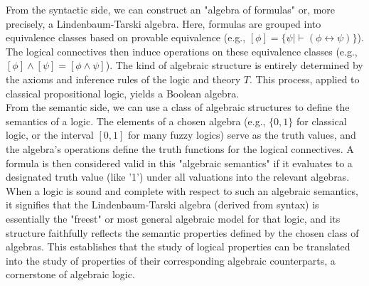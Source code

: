From the syntactic side, we can construct an "algebra of formulas" or, more precisely, a Lindenbaum-Tarski algebra. Here, formulas are grouped into equivalence classes based on provable equivalence (e.g., $[\phi] = \{\psi \mid \vdash (\phi \leftrightarrow \psi)\}$). The logical connectives then induce operations on these equivalence classes (e.g., $[\phi] \wedge [\psi] = [\phi \wedge \psi]$). The kind of algebraic structure is entirely determined by the axioms and inference rules of the logic and theory $T$. This process, applied to classical propositional logic, yields a Boolean algebra.\\

From the semantic side, we can use a class of algebraic structures to define the semantics of a logic. The elements of a chosen algebra (e.g., $\{0,1\}$ for classical logic, or the interval $[0,1]$ for many fuzzy logics) serve as the truth values, and the algebra's operations define the truth functions for the logical connectives. A formula is then considered valid in this "algebraic semantics" if it evaluates to a designated truth value (like '1') under all valuations into the relevant algebras. When a logic is sound and complete with respect to such an algebraic semantics, it signifies that the Lindenbaum-Tarski algebra (derived from syntax) is essentially the "freest" or most general algebraic model for that logic, and its structure faithfully reflects the semantic properties defined by the chosen class of algebras. This establishes that the study of logical properties can be translated into the study of properties of their corresponding algebraic counterparts, a cornerstone of algebraic logic.\\

